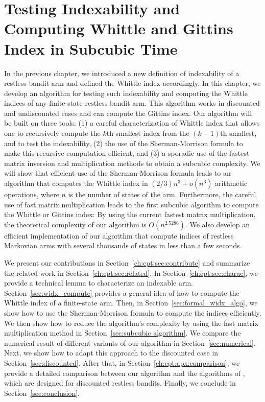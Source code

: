 \begingroup

\let\clearpage\relax

\chapter{Testing Indexability and Computing Whittle and Gittins Index in Subcubic Time}
\label{ch:index_computation}

In the previous chapter, we introduced a new definition of indexability of a restless bandit arm and defined the Whittle index accordingly.
In this chapter, we develop an algorithm for testing such indexability and computing the Whittle indices of any finite-state restless bandit arm.
This algorithm works in discounted and undiscounted cases and can compute the Gittins index.
Our algorithm will be built on three tools: (1) a careful characterization of Whittle index that allows one to recursively compute the $k$th smallest index from the $(k-1)$th smallest, and to test the indexability, (2) the use of the Sherman-Morrison formula to make this recursive computation efficient, and (3) a sporadic use of the fastest matrix inversion and multiplication methods to obtain a subcubic complexity.
We will show that efficient use of the Sherman-Morrison formula leads to an algorithm that computes the Whittle index in $(2/3)n^3 + o(n^3)$ arithmetic operations, where $n$ is the number of states of the arm. 
Furthermore, the careful use of fast matrix multiplication leads to the first subcubic algorithm to compute the Whittle or Gittins index: By using the current fastest matrix multiplication, the theoretical complexity of our algorithm is $O(n^{2.5286})$.
We also develop an efficient implementation of our algorithm that compute indices of restless Markovian arms with several thousands of states in less than a few seconds.

We present our contributions in Section~\ref{ch:cpt:sec:contribute} and summarize the related work in Section~\ref{ch:cpt:sec:related}.
In Section~\ref{ch:cpt:sec:charac}, we provide a technical lemma to characterize an indexable arm.
Section~\ref{sec:widx_compute} provides a general idea of how to compute the Whittle index of a finite-state arm.
Then, in Section~\ref{sec:formal_widx_algo}, we show how to use the Sherman-Morrison formula to compute the indices efficiently. We then show how to reduce the algorithm's complexity by using the fast matrix multiplication method in Section~\ref{sec:subcubic algorithm}. We compare the numerical result of different variants of our algorithm in Section~\ref{sec:numerical}. Next, we show how to adapt this approach to the discounted case in Section~\ref{sec:discounted}.
After that, in Section~\ref{ch:cpt:apx:comparison}, we provide a detailed comparison between our algorithm and the algorithms of \cite{nino2020fast, akbarzadeh2020conditions}, which are designed for discounted restless bandits.
Finally, we conclude in Section~\ref{sec:conclusion}.

